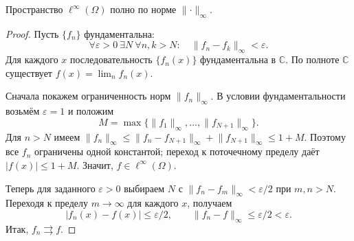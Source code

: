 \begin{theorem}\label{thm-completeness}

Пространство \(\ell^\infty(\Omega)\) полно по норме \(\lVert \cdot\rVert_\infty\).

\end{theorem}

\begin{proof}

Пусть \(\{f_n\}\) фундаментальна: \[
\forall\varepsilon>0\ \exists N\ \forall n,k>N:
\quad \lVert f_n-f_k\rVert_\infty<\varepsilon.
\] Для каждого \(x\) последовательность \(\{f_n(x)\}\) фундаментальна в \(\mathbb C\). По полноте \(\mathbb C\) существует \(f(x)=\lim_n f_n(x)\).

Сначала покажем ограниченность норм \(\lVert f_n\rVert_\infty\). В условии фундаментальности возьмём \(\varepsilon=1\) и положим \[
M=\max\{\lVert f_1\rVert_\infty,\ldots,\lVert f_{N+1}\rVert_\infty\}.
\] Для \(n>N\) имеем \(\lVert f_n\rVert_\infty\le\lVert f_n-f_{N+1}\rVert_\infty+\lVert f_{N+1}\rVert_\infty\le1+M\). Поэтому все \(f_n\) ограничены одной константой; переход к поточечному пределу даёт \(|f(x)|\le1+M\). Значит, \(f\in\ell^\infty(\Omega)\).

Теперь для заданного \(\varepsilon>0\) выбираем \(N\) с \(\lVert f_n-f_m\rVert_\infty<\varepsilon/2\) при \(m,n>N\). Переходя к пределу \(m\to\infty\) для каждого \(x\), получаем \[
|f_n(x)-f(x)|\le\varepsilon/2,
\qquad \lVert f_n-f\rVert_\infty\le\varepsilon/2<\varepsilon.
\] Итак, \(f_n\rightrightarrows f\).

\end{proof}
